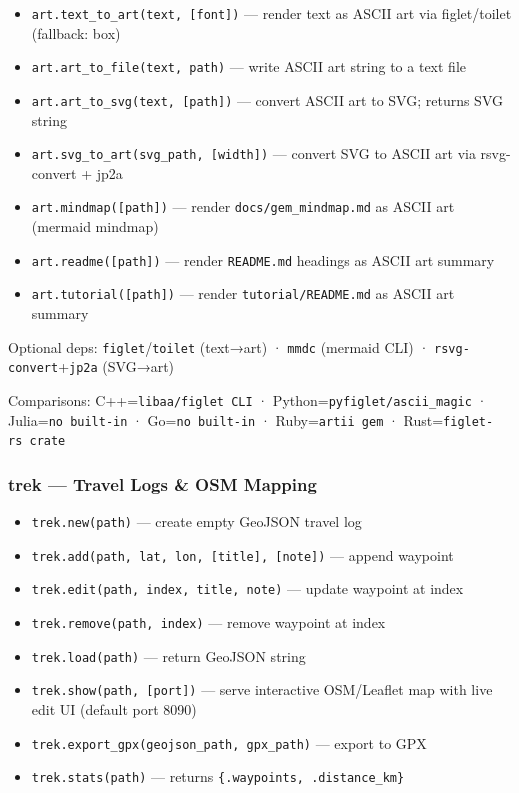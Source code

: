 \documentclass[
]{article}
\providecommand{\tightlist}{%
  \setlength{\itemsep}{0pt}\setlength{\parskip}{0pt}}
\begin{document}
\begin{itemize}
\tightlist
\item
  \texttt{art.text\_to\_art(text,\ {[}font{]})} --- render text as ASCII
  art via figlet/toilet (fallback: box)
\item
  \texttt{art.art\_to\_file(text,\ path)} --- write ASCII art string to
  a text file
\item
  \texttt{art.art\_to\_svg(text,\ {[}path{]})} --- convert ASCII art to
  SVG; returns SVG string
\item
  \texttt{art.svg\_to\_art(svg\_path,\ {[}width{]})} --- convert SVG to
  ASCII art via rsvg-convert + jp2a
\item
  \texttt{art.mindmap({[}path{]})} --- render
  \texttt{docs/gem\_mindmap.md} as ASCII art (mermaid mindmap)
\item
  \texttt{art.readme({[}path{]})} --- render \texttt{README.md} headings
  as ASCII art summary
\item
  \texttt{art.tutorial({[}path{]})} --- render
  \texttt{tutorial/README.md} as ASCII art summary
\end{itemize}

Optional deps: \texttt{figlet}/\texttt{toilet} (text→art) ·
\texttt{mmdc} (mermaid CLI) · \texttt{rsvg-convert}+\texttt{jp2a}
(SVG→art)

Comparisons: C++=\texttt{libaa/figlet\ CLI} ·
Python=\texttt{pyfiglet/ascii\_magic} · Julia=\texttt{no\ built-in} ·
Go=\texttt{no\ built-in} · Ruby=\texttt{artii\ gem} ·
Rust=\texttt{figlet-rs\ crate}

\subsubsection{trek --- Travel Logs \& OSM
Mapping}\label{trek-travel-logs-osm-mapping}

\begin{itemize}
\tightlist
\item
  \texttt{trek.new(path)} --- create empty GeoJSON travel log
\item
  \texttt{trek.add(path,\ lat,\ lon,\ {[}title{]},\ {[}note{]})} ---
  append waypoint
\item
  \texttt{trek.edit(path,\ index,\ title,\ note)} --- update waypoint at
  index
\item
  \texttt{trek.remove(path,\ index)} --- remove waypoint at index
\item
  \texttt{trek.load(path)} --- return GeoJSON string
\item
  \texttt{trek.show(path,\ {[}port{]})} --- serve interactive
  OSM/Leaflet map with live edit UI (default port 8090)
\item
  \texttt{trek.export\_gpx(geojson\_path,\ gpx\_path)} --- export to GPX
\item
  \texttt{trek.stats(path)} --- returns
  \texttt{\{.waypoints,\ .distance\_km\}}
\end{itemize}
\end{document}
